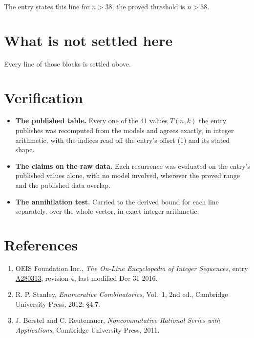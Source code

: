 \documentclass[11pt]{article}
\theoremstyle{definition}
\begin{document}
The entry states this line for $n > 38$; the proved threshold is $n > 38$.

\section{What is not settled here}

Every line of those blocks is settled above.

\section{Verification}

\begin{itemize}

\item {\bfseries The published table.} Every one of the 41 values $T(n,k)$ the entry publishes was recomputed from the models and agrees exactly, in integer arithmetic, with the indices read off the entry's offset (1) and its stated shape.

\item {\bfseries The claims on the raw data.} Each recurrence was evaluated on the entry's published values alone, with no model involved, wherever the proved range and the published data overlap.

\item {\bfseries The annihilation test.} Carried to the derived bound for each line separately, over the whole vector, in exact integer arithmetic.

\end{itemize}

\section{References}

\begin{enumerate}

\item OEIS Foundation Inc., \emph{The On-Line Encyclopedia of Integer Sequences}, entry \href{https://oeis.org/A280313}{A280313}, revision 4, last modified Dec 31 2016.

\item R. P. Stanley, \emph{Enumerative Combinatorics}, Vol.~1, 2nd ed., Cambridge University Press, 2012; \S4.7.

\item J. Berstel and C. Reutenauer, \emph{Noncommutative Rational Series with Applications}, Cambridge University Press, 2011.

\end{enumerate}
\end{document}
